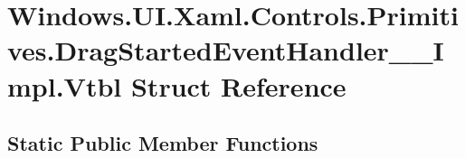 \hypertarget{struct_windows_1_1_u_i_1_1_xaml_1_1_controls_1_1_primitives_1_1_drag_started_event_handler_____impl_1_1_vtbl}{}\section{Windows.\+U\+I.\+Xaml.\+Controls.\+Primitives.\+Drag\+Started\+Event\+Handler\+\_\+\+\_\+\+Impl.\+Vtbl Struct Reference}
\label{struct_windows_1_1_u_i_1_1_xaml_1_1_controls_1_1_primitives_1_1_drag_started_event_handler_____impl_1_1_vtbl}
\subsection*{Static Public Member Functions}
